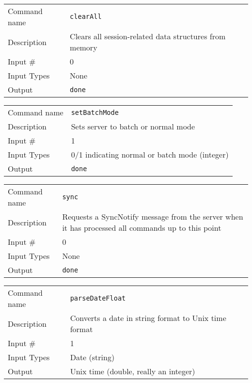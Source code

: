 \bigskip

\noindent
\begin{tabular}{l|p{5in}}
\hline
Command name & {\tt clearAll} \\
Description  & Clears all session-related data structures from memory \\
Input \#     & 0 \\
Input Types  & None \\
Output       & {\tt done} \\
\hline
\end{tabular}

\bigskip

\noindent
\begin{tabular}{l|p{5in}}
\hline
Command name & {\tt setBatchMode} \\
Description  & Sets server to batch or normal mode \\
Input \#     & 1 \\
Input Types  & 0/1 indicating normal or batch mode (integer) \\
Output       & {\tt done} \\
\hline
\end{tabular}

\bigskip

\noindent
\begin{tabular}{l|p{5in}}
\hline
Command name & {\tt sync} \\
Description  & Requests a SyncNotify message from the server when it has
               processed all commands up to this point \\
Input \#     & 0 \\
Input Types  & None \\
Output       & {\tt done} \\
\hline
\end{tabular}

\bigskip

\noindent
\begin{tabular}{l|p{5in}}
\hline
Command name & {\tt parseDateFloat} \\
Description  & Converts a date in string format to Unix time format \\
Input \#     & 1 \\
Input Types  & Date (string) \\
Output       & Unix time (double, really an integer) \\
\hline
\end{tabular}

\bigskip

